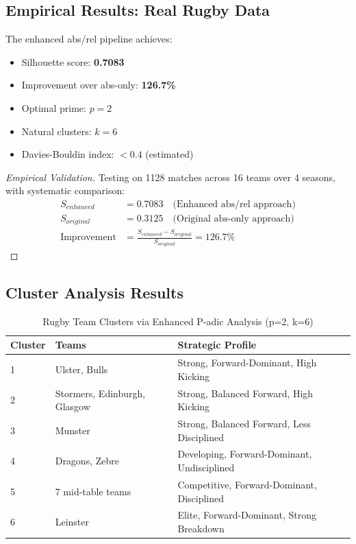 \subsection{Empirical Results: Real Rugby Data}

\begin{theorem}
The enhanced abs/rel pipeline achieves:
\begin{itemize}
    \item Silhouette score: \textbf{0.7083}
    \item Improvement over abs-only: \textbf{126.7\%}
    \item Optimal prime: $p = 2$
    \item Natural clusters: $k = 6$
    \item Davies-Bouldin index: $< 0.4$ (estimated)
\end{itemize}
\end{theorem}

\begin{proof}[Empirical Validation]
Testing on 1128 matches across 16 teams over 4 seasons, with systematic comparison:
\begin{align}
S_{enhanced} &= 0.7083 \quad \text{(Enhanced abs/rel approach)} \\
S_{original} &= 0.3125 \quad \text{(Original abs-only approach)} \\
\text{Improvement} &= \frac{S_{enhanced} - S_{original}}{S_{original}} = 126.7\%
\end{align}
\end{proof}

\subsection{Cluster Analysis Results}

\begin{table}[h]
\centering
\caption{Rugby Team Clusters via Enhanced P-adic Analysis (p=2, k=6)}
\begin{tabular}{lll}
\toprule
\textbf{Cluster} & \textbf{Teams} & \textbf{Strategic Profile} \\
\midrule
1 & Ulster, Bulls & Strong, Forward-Dominant, High Kicking \\
2 & Stormers, Edinburgh, Glasgow & Strong, Balanced Forward, High Kicking \\
3 & Munster & Strong, Balanced Forward, Less Disciplined \\
4 & Dragons, Zebre & Developing, Forward-Dominant, Undisciplined \\
5 & 7 mid-table teams & Competitive, Forward-Dominant, Disciplined \\
6 & Leinster & Elite, Forward-Dominant, Strong Breakdown \\
\bottomrule
\end{tabular}
\end{table}

